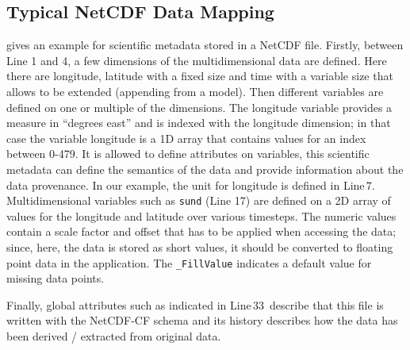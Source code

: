 \subsection{Typical NetCDF Data Mapping}
\label{sec:netcdfDataMapping}
 gives an example for scientific metadata stored in a NetCDF file.
Firstly, between Line 1 and 4, a few dimensions of the multidimensional data are defined.
Here there are longitude, latitude with a fixed size and time with a variable size that allows to be extended (appending from a model).
Then different variables are defined on one or multiple of the dimensions.
The longitude variable provides a measure in “degrees east” and is indexed with the longitude dimension; in that case the variable longitude is a 1D array that contains values for an index between 0-479.
It is allowed to define attributes on variables, this scientific metadata can define the semantics of the data and provide information about the data provenance.
In our example, the unit for longitude is defined in Line\,7.
Multidimensional variables such as \texttt{sund} (Line 17) are defined on a 2D array of values for the longitude and latitude over various timesteps.
The numeric values contain a scale factor and offset that has to be applied when accessing the data; since, here, the data is stored as short values, it should be converted to floating point data in the application.
The \texttt{\_FillValue} indicates a default value for missing data points.

Finally, global attributes such as indicated in Line\,33\, describe that this file is written with the NetCDF-CF schema and its history describes how the data has been derived / extracted from original data.

